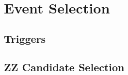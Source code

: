 \section{Event Selection}
\label{sec:evt_sel}

\subsection{Triggers}

\subsection{ZZ Candidate Selection}
\label{subsec:zz_sel}